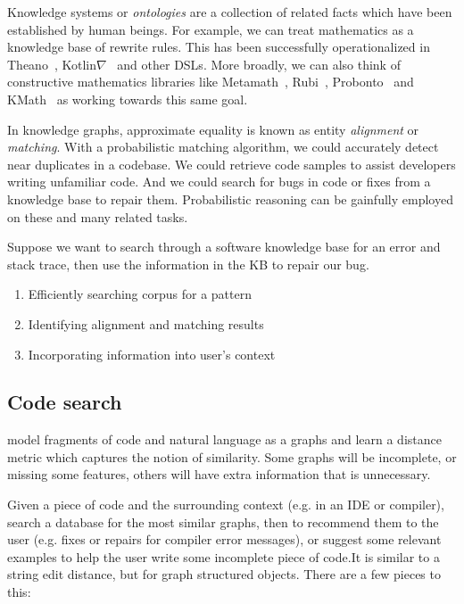 \documentclass[11pt]{article}
\begin{document}
    Knowledge systems or \textit{ontologies} are a collection of related facts which have been established by human beings. For example, we can treat mathematics as a knowledge base of rewrite rules. This has been successfully operationalized in Theano~\citep{bergstra2010theano}, Kotlin$\nabla$~\citep{considine2019kotlingrad} and other DSLs. More broadly, we can also think of constructive mathematics libraries like Metamath~\citep{megill2006metamath},  Rubi~\citep{rich2009knowledge}, Probonto~\citep{swat2016probonto} and KMath~\citep{nozik2019kotlin} as working towards this same goal.

    In knowledge graphs, approximate equality is known as entity \textit{alignment} or \textit{matching}. With a probabilistic matching algorithm, we could accurately detect near duplicates in a codebase. We could retrieve code samples to assist developers writing unfamiliar code. And we could search for bugs in code or fixes from a knowledge base to repair them. Probabilistic reasoning can be gainfully employed on these and many related tasks.

    Suppose we want to search through a software knowledge base for an error and stack trace, then use the information in the KB to repair our bug.

    \begin{enumerate}
        \item Efficiently searching corpus for a pattern
        \item Identifying alignment and matching results
        \item Incorporating information into user's context
    \end{enumerate}

    \subsection{Code search}

    model fragments of code and natural language as a graphs and learn a distance metric which captures the notion of similarity. Some graphs will be incomplete, or missing some features, others will have extra information that is unnecessary.

    Given a piece of code and the surrounding context (e.g. in an IDE or compiler), search a database for the most similar graphs, then to recommend them to the user (e.g. fixes or repairs for compiler error messages), or suggest some relevant examples to help the user write some incomplete piece of code.It is similar to a string edit distance, but for graph structured objects. There are a few pieces to this:
\end{document}
